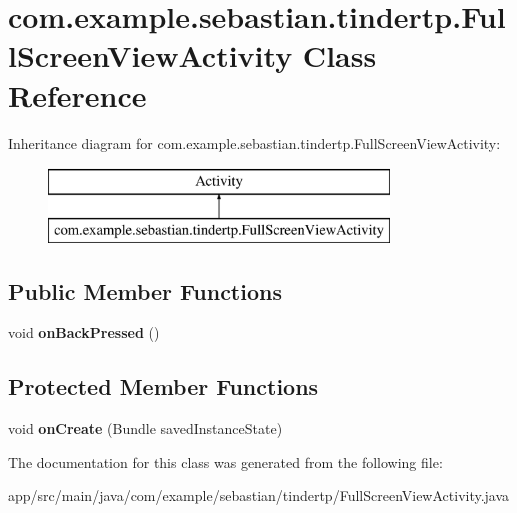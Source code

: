 \hypertarget{classcom_1_1example_1_1sebastian_1_1tindertp_1_1FullScreenViewActivity}{}\section{com.\+example.\+sebastian.\+tindertp.\+Full\+Screen\+View\+Activity Class Reference}
\label{classcom_1_1example_1_1sebastian_1_1tindertp_1_1FullScreenViewActivity}
Inheritance diagram for com.\+example.\+sebastian.\+tindertp.\+Full\+Screen\+View\+Activity\+:\begin{figure}[H]
\begin{center}
\leavevmode
\includegraphics[height=2.000000cm]{classcom_1_1example_1_1sebastian_1_1tindertp_1_1FullScreenViewActivity}
\end{center}
\end{figure}
\subsection*{Public Member Functions}
\begin{DoxyCompactItemize}
\item 
void {\bfseries on\+Back\+Pressed} ()\hypertarget{classcom_1_1example_1_1sebastian_1_1tindertp_1_1FullScreenViewActivity_ab3e5e99f9f3e016ac05a404a4d7bb1a8}{}\label{classcom_1_1example_1_1sebastian_1_1tindertp_1_1FullScreenViewActivity_ab3e5e99f9f3e016ac05a404a4d7bb1a8}

\end{DoxyCompactItemize}
\subsection*{Protected Member Functions}
\begin{DoxyCompactItemize}
\item 
void {\bfseries on\+Create} (Bundle saved\+Instance\+State)\hypertarget{classcom_1_1example_1_1sebastian_1_1tindertp_1_1FullScreenViewActivity_af5c079a6d858da39f42f1cdcff02cf8a}{}\label{classcom_1_1example_1_1sebastian_1_1tindertp_1_1FullScreenViewActivity_af5c079a6d858da39f42f1cdcff02cf8a}

\end{DoxyCompactItemize}


The documentation for this class was generated from the following file\+:\begin{DoxyCompactItemize}
\item 
app/src/main/java/com/example/sebastian/tindertp/Full\+Screen\+View\+Activity.\+java\end{DoxyCompactItemize}
